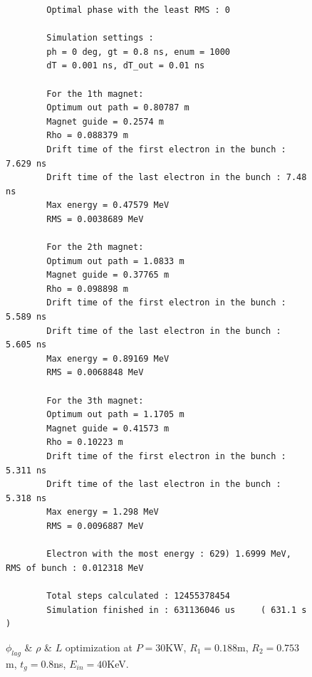 \documentclass[a4paper,oneside,12pt]{report}
\numberwithin{equation}{chapter}
\begin{document}
\begin{figure}[H]
    \centering
    \begin{verbatim}
        Optimal phase with the least RMS : 0

        Simulation settings : 
        ph = 0 deg, gt = 0.8 ns, enum = 1000
        dT = 0.001 ns, dT_out = 0.01 ns
        
        For the 1th magnet:
        Optimum out path = 0.80787 m
        Magnet guide = 0.2574 m
        Rho = 0.088379 m
        Drift time of the first electron in the bunch : 7.629 ns
        Drift time of the last electron in the bunch : 7.48 ns
        Max energy = 0.47579 MeV
        RMS = 0.0038689 MeV
        
        For the 2th magnet:
        Optimum out path = 1.0833 m
        Magnet guide = 0.37765 m
        Rho = 0.098898 m
        Drift time of the first electron in the bunch : 5.589 ns
        Drift time of the last electron in the bunch : 5.605 ns
        Max energy = 0.89169 MeV
        RMS = 0.0068848 MeV
        
        For the 3th magnet:
        Optimum out path = 1.1705 m
        Magnet guide = 0.41573 m
        Rho = 0.10223 m
        Drift time of the first electron in the bunch : 5.311 ns
        Drift time of the last electron in the bunch : 5.318 ns
        Max energy = 1.298 MeV
        RMS = 0.0096887 MeV
        
        Electron with the most energy : 629) 1.6999 MeV,	RMS of bunch : 0.012318 MeV
        
        Total steps calculated : 12455378454
        Simulation finished in : 631136046 us     ( 631.1 s )        
    \end{verbatim}
    \vspace{20pt}
\caption{$\phi_{lag}$ \& $\rho$ \& $L$ optimization at $P=30$KW, $R_1=0.188$m, $R_2=0.753$m, $t_g=0.8$ns, $E_{in}=40$KeV.}
\label{fig:lout_opt_08ns_Erms}
\end{figure}
\end{document}
